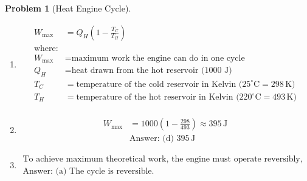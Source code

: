 \documentclass[12pt]{article}
\theoremstyle{definition} %
\newtheorem{problem}{Problem}
\theoremstyle{plain} %
\begin{document}
\begin{problem}[Heat Engine Cycle]
    \noindent   
    \begin{enumerate}
        \item \begin{align*}
        W_{\text{max}} &= Q_H \left( 1 - \frac{T_C}{T_H} \right) \\
        \text{where:} \\
        W_{\text{max}} &= \text{maximum work the engine can do in one cycle} \\
        Q_H &= \text{heat drawn from the hot reservoir (1000 J)} \\
        T_C &= \text{temperature of the cold reservoir in Kelvin (} 25^\circ \text{C} = 298 \, \text{K)} \\
        T_H &= \text{temperature of the hot reservoir in Kelvin (} 220^\circ \text{C} = 493 \, \text{K)} \\
        \end{align*}
        \item \begin{align*}
        W_{\text{max}} &= 1000 \left( 1 - \frac{298}{493} \right) \approx 395 \, \text{J} \\
        &\text{Answer: (d) } 395 \, \text{J}
        \end{align*}
        \item \begin{align*}
        \text{To achieve maximum theoretical work, the engine must operate reversibly, meaning:} \\
        \text{Answer: (a) The cycle is reversible.}
        \end{align*}
    \end{enumerate}
\end{problem}
\end{document}
